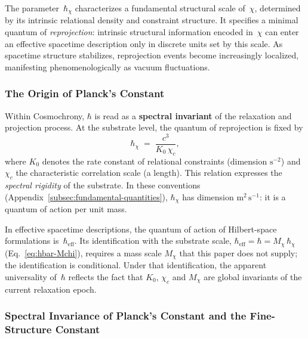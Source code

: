     The parameter~$\hbar_\chi$ characterizes a fundamental structural scale
    of~$\chi$, determined by its intrinsic relational density and constraint
    structure.
    It specifies a minimal quantum of \emph{reprojection}: intrinsic
    structural information encoded in~$\chi$ can enter an effective spacetime
    description only in discrete units set by this scale.
    As spacetime structure stabilizes, reprojection events become increasingly
    localized, manifesting phenomenologically as vacuum fluctuations.

  \subsubsection*{The Origin of Planck's Constant}
    \label{subsec:h-origin}

    Within Cosmochrony, $\hbar$ is read as a \textbf{spectral invariant} of the
    relaxation and projection process.
    At the substrate level, the quantum of reprojection is fixed by
    \begin{equation}
      \hbar_\chi \;=\; \frac{c^3}{K_0\,\chi_c} ,
      \label{eq:spectral-invariant}
    \end{equation}
    where $K_0$ denotes the rate constant of relational constraints (dimension $\mathrm{s}^{-2}$) and
    $\chi_c$ the characteristic correlation scale (a length).
    This relation expresses the \emph{spectral rigidity} of the substrate.
    In these conventions (Appendix~\ref{subsec:fundamental-quantities}), $\hbar_\chi$ has dimension
    $\mathrm{m}^2\,\mathrm{s}^{-1}$: it is a quantum of action per unit mass.

    In effective spacetime descriptions, the quantum of action of
    Hilbert-space formulations is~$\hbar_{\mathrm{eff}}$.
    Its identification with the substrate scale, $\hbar_{\mathrm{eff}} = \hbar = M_\chi\,\hbar_\chi$
    (Eq.~\eqref{eq:hbar-Mchi}), requires a mass scale $M_\chi$ that this paper does not supply; the identification
    is conditional.
    Under that identification, the apparent universality of~$\hbar$ reflects the fact that $K_0$,
    $\chi_c$ and $M_\chi$ are global invariants of the current relaxation epoch.

  \subsubsection*{Spectral Invariance of Planck's Constant and the
  Fine-Structure Constant}
    \label{subsec:quantum-invariants}

